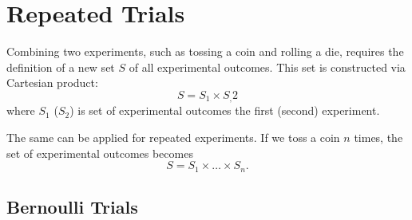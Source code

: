 \documentclass[a4paper, oneside]{book}
\begin{document}
\chapter{Repeated Trials}
Combining two experiments, such as tossing a coin and rolling a die, requires the definition of a new set $S$ of all experimental outcomes. This set is constructed via Cartesian product:
$$S=S_1\times S_,2$$
where $S_1$ ($S_2$) is set of experimental outcomes the first (second) experiment.

The same can be applied for repeated experiments. If we toss a coin $n$ times, the set of experimental outcomes becomes $$S = S_1\times \hdots \times S_n.$$

\section{Bernoulli Trials}
\end{document}
